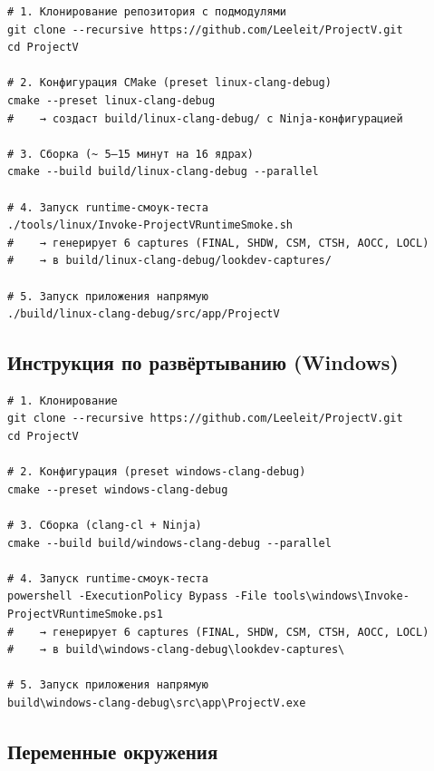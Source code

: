 \begin{verbatim}
# 1. Клонирование репозитория с подмодулями
git clone --recursive https://github.com/Leeleit/ProjectV.git
cd ProjectV

# 2. Конфигурация CMake (preset linux-clang-debug)
cmake --preset linux-clang-debug
#    → создаст build/linux-clang-debug/ с Ninja-конфигурацией

# 3. Сборка (~ 5–15 минут на 16 ядрах)
cmake --build build/linux-clang-debug --parallel

# 4. Запуск runtime-смоук-теста
./tools/linux/Invoke-ProjectVRuntimeSmoke.sh
#    → генерирует 6 captures (FINAL, SHDW, CSM, CTSH, AOCC, LOCL)
#    → в build/linux-clang-debug/lookdev-captures/

# 5. Запуск приложения напрямую
./build/linux-clang-debug/src/app/ProjectV
\end{verbatim}

\subsection{Инструкция по развёртыванию (Windows)}\label{KT-3.1_User_Guide-ux438ux43dux441ux442ux440ux443ux43aux446ux438ux44f-ux43fux43e-ux440ux430ux437ux432ux451ux440ux442ux44bux432ux430ux43dux438ux44e-windows}

\begin{verbatim}
# 1. Клонирование
git clone --recursive https://github.com/Leeleit/ProjectV.git
cd ProjectV

# 2. Конфигурация (preset windows-clang-debug)
cmake --preset windows-clang-debug

# 3. Сборка (clang-cl + Ninja)
cmake --build build/windows-clang-debug --parallel

# 4. Запуск runtime-смоук-теста
powershell -ExecutionPolicy Bypass -File tools\windows\Invoke-ProjectVRuntimeSmoke.ps1
#    → генерирует 6 captures (FINAL, SHDW, CSM, CTSH, AOCC, LOCL)
#    → в build\windows-clang-debug\lookdev-captures\

# 5. Запуск приложения напрямую
build\windows-clang-debug\src\app\ProjectV.exe
\end{verbatim}

\subsection{Переменные окружения}\label{KT-3.1_User_Guide-ux43fux435ux440ux435ux43cux435ux43dux43dux44bux435-ux43eux43aux440ux443ux436ux435ux43dux438ux44f}

